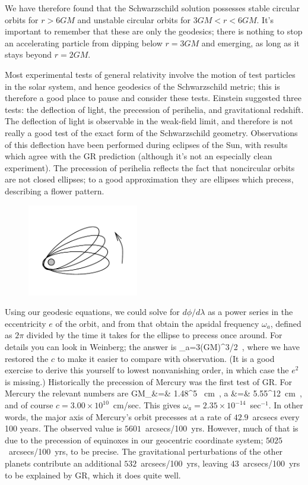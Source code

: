 \documentclass[12pt]{article}
\begin{document}
We have therefore found that the Schwarzschild solution possesses
stable circular orbits for $r>6GM$ and unstable circular orbits for
$3GM < r < 6GM$.  It's important to remember that these are only
the geodesics; there is nothing to stop an accelerating particle from
dipping below $r=3GM$ and emerging, as long as it stays beyond
$r=2GM$.

Most experimental tests of general relativity involve the motion of
test particles in the solar system, and hence geodesics
of the Schwarzschild metric; this is therefore a good place to
pause and consider these tests.  Einstein suggested three tests:
the deflection of light, the precession of perihelia, and gravitational
redshift.  The deflection of light is observable in the weak-field
limit, and therefore is not really a good test of the exact
form of the Schwarzschild geometry.  Observations of this deflection
have been performed during eclipses of the Sun, with results which
agree with the GR prediction (although it's not an especially clean
experiment).  The precession of perihelia reflects
the fact that noncircular orbits are not closed ellipses; to a good
approximation they are ellipses which precess, describing a flower pattern.

\begin{figure}
  \centerline{
  \includegraphics[height=4cm]{pdf/seven8}}
\end{figure}

Using our geodesic equations, we could solve for 
$d\phi/d\lambda$ as a power series in the eccentricity $e$ of the
orbit, and from that obtain the apsidal frequency $\omega_a$,
defined as $2\pi$ divided by the time it takes for the ellipse to
precess once around.
For details you can look in Weinberg; the answer is
\be
  \omega_a={{3(GM)^{3/2}}}\ ,\label{7.56}
\ee
where we have restored the $c$ to make it easier to compare with
observation.
(It is a good exercise to derive this yourself to lowest nonvanishing
order, in which case the $e^2$ is missing.)  Historically the
precession of Mercury was the first test of GR.  For Mercury the 
relevant numbers are
\bea
  {{GM_\odot}}&=& 1.48^5 {\rm ~cm}\ ,\cr
  a &=&  5.55^{12}{\rm ~cm}\ ,\label{7.57}
\eea
and of course $c=3.00\times 10^{10}$~cm/sec.  This gives $\omega_a
= 2.35\times 10^{-14}$~sec$^{-1}$.  In other words, the major axis
of Mercury's orbit precesses at a rate of $42.9$~arcsecs every 100
years.  The observed value is $5601$~arcsecs/100~yrs.  However,
much of that is due to the precession of equinoxes in our geocentric
coordinate system; $5025$~arcsecs/100~yrs, to be precise.  The
gravitational perturbations of the other planets contribute an
additional $532$~arcsecs/100~yrs, leaving $43$~arcsecs/100~yrs
to be explained by GR, which it does quite well.
\end{document}
